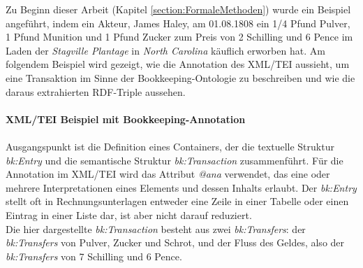 \documentclass[12pt,a4paper]{article}
\begin{document}
Zu Beginn dieser Arbeit (Kapitel \ref{section:FormaleMethoden}) wurde ein Beispiel angeführt, indem ein Akteur, James Haley, am 01.08.1808 ein 1/4 Pfund Pulver, 1 Pfund Munition und 1 Pfund Zucker zum Preis von 2 Schilling und 6 Pence im Laden der \textit{Stagville Plantage} in \textit{North Carolina} käuflich erworben hat. Am folgendem Beispiel wird gezeigt, wie die Annotation des XML/TEI aussieht, um eine Transaktion im Sinne der Bookkeeping-Ontologie zu beschreiben und wie die daraus extrahierten RDF-Triple aussehen.
\\
\\
\textbf{XML/TEI Beispiel mit Bookkeeping-Annotation}
\\
\\
Ausgangspunkt ist die Definition eines Containers, der die textuelle Struktur \textit{bk:Entry} und die semantische Struktur \textit{bk:Transaction} zusammenführt. Für die Annotation im XML/TEI wird das Attribut \textit{@ana} verwendet, das eine oder mehrere Interpretationen eines Elements und dessen Inhalts erlaubt. Der \textit{bk:Entry} stellt oft in Rechnungsunterlagen entweder eine Zeile in einer Tabelle oder einen Eintrag in einer Liste dar, ist aber nicht darauf reduziert.
\\
Die hier dargestellte \textit{bk:Transaction} besteht aus zwei \textit{bk:Transfers}: der \textit{bk:Transfers} von Pulver, Zucker und Schrot, und der Fluss des Geldes, also der \textit{bk:Transfers} von 7 Schilling und 6 Pence.
\end{document}
